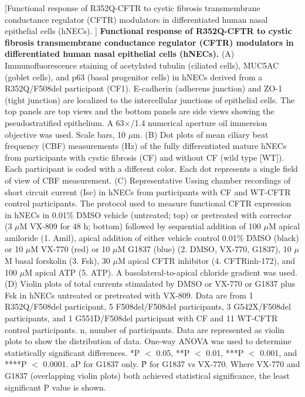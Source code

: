 	[Functional response of R352Q-CFTR to cystic fibrosis transmembrane conductance regulator (CFTR) modulators in differentiated human nasal epithelial cells (hNECs). ] {\textbf{Functional response of R352Q-CFTR to cystic fibrosis transmembrane conductance regulator (CFTR) modulators in differentiated human nasal epithelial cells (hNECs). }}{(A) Immunofluorescence staining of acetylated tubulin (ciliated cells), MUC5AC (goblet cells), and p63 (basal progenitor cells) in hNECs derived from a R352Q/F508del participant (CF1). E-cadherin (adherens junction) and ZO-1 (tight junction) are localized to the intercellular junctions of epithelial cells. The top panels are top views and the bottom panels are side views showing the pseudostratified epithelium. A 63$\times$/1.4 numerical aperture oil immersion objective was used. Scale bars, 10 $\mu$m. (B) Dot plots of mean ciliary beat frequency (CBF) measurements (Hz) of the fully differentiated mature hNECs from participants with cystic fibrosis (CF) and without CF (wild type [WT]). Each participant is coded with a different color. Each dot represents a single field of view of CBF measurement. (C) Representative Ussing chamber recordings of short circuit current (Isc) in hNECs from participants with CF and WT-CFTR control participants. The protocol used to measure functional CFTR expression in hNECs in 0.01\% DMSO vehicle (untreated; top) or pretreated with corrector (3 $\mu$M VX-809 for 48 h; bottom) followed by sequential addition of 100 $\mu$M apical amiloride (1. Amil), apical addition of either vehicle control 0.01\% DMSO (black) or 10 $\mu$M VX-770 (red) or 10 $\mu$M G1837 (blue) (2. DMSO, VX-770, G1837), 10 $\mu$M basal forskolin (3. Fsk), 30 $\mu$M apical CFTR inhibitor (4. CFTRinh-172), and 100 $\mu$M apical ATP (5. ATP). A basolateral-to-apical chloride gradient was used. (D) Violin plots of total currents stimulated by DMSO or VX-770 or G1837 plus Fsk in hNECs untreated or pretreated with VX-809. Data are from 1 R352Q/F508del participant, 5 F508del/F508del participants, 3 G542X/F508del participants, and 1 G551D/F508del participant with CF and 11 WT-CFTR control participants. n, number of participants. Data are represented as violin plots to show the distribution of data. One-way ANOVA was used to determine statistically significant differences. *P $<$ 0.05, **P $<$ 0.01, ***P $<$ 0.001, and ****P $<$ 0.0001. aP for G1837 only. \^P for G1837 vs VX-770. Where VX-770 and G1837 (overlapping violin plots) both achieved statistical significance, the least significant P value is shown.}
	\endgroup

